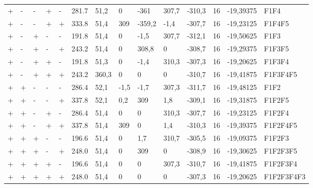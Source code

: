 \documentclass[12pt]{article}
\begin{document}
\begin{table}[]
{\begin{tabular}{llllllllllllll}
+ & - & - & + & - & 281.7  &  51,2   	&0			&-361		&307,7		&-310,3		&16		&-19,39375		&F1F4		\\	
+ & - & - & + & + & 333.8  &  51,4   	&309		&-359,2		&-1,4		&-307,7		&16		&-19,23125		&F1F4F5		\\	
+ & - & + & - & - & 191.8  &  51,4   	&0			&-1,5		&307,7		&-312,1		&16		&-19,50625		&F1F3		\\	
+ & - & + & - & + & 243.2  &  51,4   	&0			&308,8		&0			&-308,7		&16		&-19,29375		&F1F3F5		\\	
+ & - & + & + & - & 191.8  &  51,3   	&0			&-1,4		&310,3		&-307,3		&16		&-19,20625		&F1F3F4		\\	
+ & - & + & + & + & 243.2  &  360,3   	&0			&0			&0			&-310,7		&16		&-19,41875		&F1F3F4F5	\\		
+ & + & - & - & - & 286.4  &  52,1   	&-1,5		&-1,7		&307,3		&-311,7		&16		&-19,48125		&F1F2		\\	
+ & + & - & - & + & 337.8  &  52,1   	&0,2		&309		&1,8		&-309,1		&16		&-19,31875		&F1F2F5		\\	
+ & + & - & + & - & 286.4  &  51,4   	&0			&0			&310,3		&-307,7		&16		&-19,23125		&F1F2F4		\\	
+ & + & - & + & + & 337.8  &  51,4   	&309		&0			&1,4		&-310,3		&16		&-19,39375		&F1F2F4F5	\\		
+ & + & + & - & - & 196.6  &  51,4   	&0			&1,7		&310,7		&-305,5		&16		&-19,09375		&F1F2F3		\\	
+ & + & + & - & + & 248.0  &  51,4   	&0			&309		&0			&-308,9		&16		&-19,30625		&F1F2F3F5	\\		
+ & + & + & + & - & 196.6  &  51,4   	&0			&0			&307,3		&-310,7		&16		&-19,41875		&F1F2F3F4	\\		
+ & + & + & + & + & 248.0  &  51,4   	&0			&0			&0			&-307,3		&16		&-19,20625		&F1F2F3F4F3			
\end{tabular}
}
\end{table}
\end{document}
